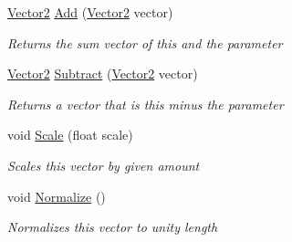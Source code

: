 \begin{DoxyCompactItemize}
\item 
\hyperlink{struct_engine_1_1_vector2}{Vector2} \hyperlink{struct_engine_1_1_vector2_aedf9845b44869874d4584d592b58a048}{Add} (\hyperlink{struct_engine_1_1_vector2}{Vector2} vector)
\begin{DoxyCompactList}\small\item\em Returns the sum vector of this and the parameter \end{DoxyCompactList}\item 
\hyperlink{struct_engine_1_1_vector2}{Vector2} \hyperlink{struct_engine_1_1_vector2_a1e6f20dbc2f29ca2a294c49af5c585c9}{Subtract} (\hyperlink{struct_engine_1_1_vector2}{Vector2} vector)
\begin{DoxyCompactList}\small\item\em Returns a vector that is this minus the parameter \end{DoxyCompactList}\item 
void \hyperlink{struct_engine_1_1_vector2_a9f43231549445b5d0449aad67cec9ec1}{Scale} (float scale)
\begin{DoxyCompactList}\small\item\em Scales this vector by given amount \end{DoxyCompactList}\item 
void \hyperlink{struct_engine_1_1_vector2_a07c14d0afe4b6445fff468c99f0f4493}{Normalize} ()
\begin{DoxyCompactList}\small\item\em Normalizes this vector to unity length \end{DoxyCompactList}\end{DoxyCompactItemize}
